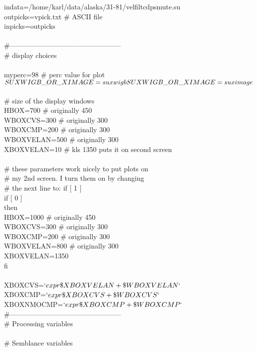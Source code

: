 indata=/home/karl/data/alaska/31-81/velfiltcdpsmute.su  \\
outpicks=vpick.txt  \# ASCII file \\
inpicks=outpicks \\
 \\
\#------------------------------------------------ \\
\# display choices \\
 \\
myperc=98       \# perc value for plot \\
$SUXWIGB\_OR\_XIMAGE=suxwigb \\
SUXWIGB\_OR\_XIMAGE=suximage $\\
 \\
\# size of the display windows \\
HBOX=700    \# originally 450 \\
WBOXCVS=300 \# originally 300 \\
WBOXCMP=200 \# originally 300 \\
WBOXVELAN=500 \# originally 300 \\
XBOXVELAN=10 \# kls 1350 puts it on second screen \\
 \\
\# these parameters work nicely to put plots on \\
\# my 2nd screen. I turn them on by changing  \\
\# the next line to:    if [ 1 ]  \\
if [ 0 ]   \\
then \\
    HBOX=1000    \# originally 450 \\
    WBOXCVS=300 \# originally 300 \\
    WBOXCMP=200 \# originally 300 \\
    WBOXVELAN=800 \# originally 300 \\
    XBOXVELAN=1350 \\
fi \\
 \\
XBOXCVS=$`expr \$XBOXVELAN + \$WBOXVELAN`$ \\
XBOXCMP=$`expr \$XBOXCVS + \$WBOXCVS`$ \\
XBOXNMOCMP=$`expr \$XBOXCMP + \$WBOXCMP`$ \\
\#------------------------------------------------ \\
\# Processing variables \\
 \\
\# Semblance variables \\
